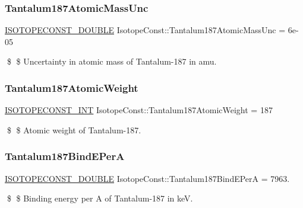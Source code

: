 \subsubsection{\texorpdfstring{Tantalum187\+Atomic\+Mass\+Unc}{Tantalum187AtomicMassUnc}}
{\footnotesize\ttfamily \mbox{\hyperlink{group___isotope_const-_macros_ga8f45a7272ce02c0b4c65c44636ed719a}{I\+S\+O\+T\+O\+P\+E\+C\+O\+N\+S\+T\+\_\+\+D\+O\+U\+B\+LE}} Isotope\+Const\+::\+Tantalum187\+Atomic\+Mass\+Unc = 6e-\/05}

\$ \$ Uncertainty in atomic mass of Tantalum-\/187 in amu. \mbox{\label{group___isotope_const-_tantalum-_ta187_gaa59e99a60dbab2a136d4f8282380408a}} 
\subsubsection{\texorpdfstring{Tantalum187\+Atomic\+Weight}{Tantalum187AtomicWeight}}
{\footnotesize\ttfamily \mbox{\hyperlink{group___isotope_const-_macros_ga5f18360b3e99483a35c32d789e62621c}{I\+S\+O\+T\+O\+P\+E\+C\+O\+N\+S\+T\+\_\+\+I\+NT}} Isotope\+Const\+::\+Tantalum187\+Atomic\+Weight = 187}

\$ \$ Atomic weight of Tantalum-\/187. \mbox{\label{group___isotope_const-_tantalum-_ta187_ga6aa855e9b2ba2453f78a7d5645b9631e}} 
\subsubsection{\texorpdfstring{Tantalum187\+Bind\+E\+PerA}{Tantalum187BindEPerA}}
{\footnotesize\ttfamily \mbox{\hyperlink{group___isotope_const-_macros_ga8f45a7272ce02c0b4c65c44636ed719a}{I\+S\+O\+T\+O\+P\+E\+C\+O\+N\+S\+T\+\_\+\+D\+O\+U\+B\+LE}} Isotope\+Const\+::\+Tantalum187\+Bind\+E\+PerA = 7963.}

\$ \$ Binding energy per A of Tantalum-\/187 in keV. \mbox{\label{group___isotope_const-_tantalum-_ta187_ga902596f2bafa43047ef56a99669994be}} 
